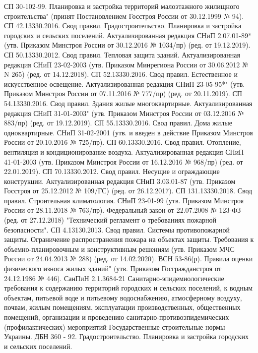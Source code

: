 \begin{thebibliography}{99}
\bibitem{}	СП 30-102-99. Планировка и застройка территорий малоэтажного жилищного строительства" (принят Постановлением Госстроя России от 30.12.1999 № 94).
\bibitem{}	СП 42.13330.2016. Свод правил. Градостроительство. Планировка и застройка городских и сельских поселений. Актуализированная редакция СНиП 2.07.01-89* (утв. Приказом Минстроя России от 30.12.2016 № 1034/пр) (ред. от 19.12.2019).
\bibitem{}	СП 50.13330.2012. Свод правил. Тепловая защита зданий. Актуализированная редакция СНиП 23-02-2003 (утв. Приказом Минрегиона России от 30.06.2012 № N 265) (ред. от 14.12.2018).
\bibitem{} СП 52.13330.2016. Свод правил. Естественное и искусственное освещение. Актуализированная редакция СНиП 23-05-95*" (утв. Приказом Минстроя России от 07.11.2016 № 777/пр) (ред. от 20.11.2019).
\bibitem{}	 СП 54.13330.2016. Свод правил. Здания жилые многоквартирные. Актуализированная редакция СНиП 31-01-2003" (утв. Приказом Минстроя России от 03.12.2016 № 883/пр) (ред. от 19.12.2019).
\bibitem{}	СП 55.13330.2016. Свод правил. Дома жилые одноквартирные. СНиП 31-02-2001 (утв. и введен в действие Приказом Минстроя России от 20.10.2016 № 725/пр).
\bibitem{}	СП 60.13330.2016. Свод правил. Отопление, вентиляция и кондиционирование воздуха. Актуализированная редакция СНиП 41-01-2003 (утв. Приказом Минстроя России от 16.12.2016 № 968/пр) (ред. от 22.01.2019).
\bibitem{}	СП 70.13330.2012. Свод правил. Несущие и ограждающие конструкции. Актуализированная редакция СНиП 3.03.01-87 (утв. Приказом Госстроя от 25.12.2012 № 109/ГС) (ред. от 26.12.2017).
\bibitem{}	СП 131.13330.2018. Свод правил. Строительная климатология. СНиП 23-01-99 (утв. Приказом Минстроя России от 28.11.2018 № 763/пр).
\bibitem{}	Федеральный закон от 22.07.2008 № 123-ФЗ (ред. от 27.12.2018) "Технический регламент о требованиях пожарной безопасности".
\bibitem{}	СП 4.13130.2013. Свод правил. Системы противопожарной защиты. Ограничение распространения пожара на объектах защиты. Требования к объемно-планировочным и конструктивным решениям (утв. Приказом МЧС России от 24.04.2013 № 288) (ред. от 14.02.2020).
\bibitem{}	ВСН 53-86(р). Правила оценки физического износа жилых зданий" (утв. Приказом Госгражданстроя от 24.12.1986 № 446).
\bibitem{}	СанПиН 2.1.3684-21 Санитарно-эпидемиологические требования к содержанию территорий городских и сельских поселений, к водным объектам, питьевой воде и питьевому водоснабжению, атмосферному воздуху, почвам, жилым помещениям, эксплуатации производственных, общественных помещений, организации и проведению санитарно-противоэпидемических (профилактических) мероприятий
\bibitem{}	Государственные строительные нормы Украины. ДБН 360 - 92. Градостроительство. Планировка и застройка городских и сельских поселений.

\end{thebibliography}
